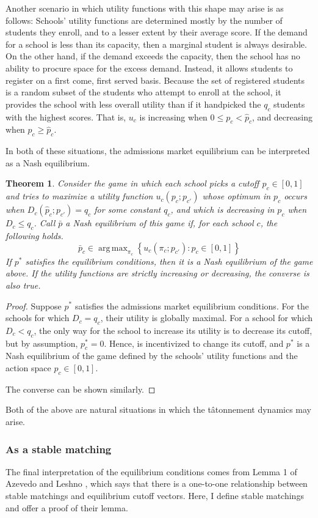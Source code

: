 \documentclass[12pt]{article}
\numberwithin{equation}{subsection}
\newtheorem{theorem}{Theorem}
\theoremstyle{definition}
\DeclareMathOperator*{\argmax}{arg\,max}
\begin{document}
Another scenario in which utility functions with this shape may arise is as follows: Schools' utility functions are determined mostly by the number of students they enroll, and to a lesser extent by their average score. If the demand for a school is less than its capacity, then a marginal student is always desirable. On the other hand, if the demand exceeds the capacity, then the school has no ability to procure space for the excess demand. Instead, it allows students to register on a first come, first served basis. Because the set of registered students is a random subset of the students who attempt to enroll at the school, it provides the school with less overall utility than if it handpicked the $q_c$ students with the highest scores. That is, $u_c$ is increasing when $0 \leq p_c < \hat p_c$, and decreasing when $p_c \geq \hat p_c$. 

In both of these situations, the admissions market equilibrium can be interpreted as a Nash equilibrium. 
\begin{theorem}
Consider the game in which each school picks a cutoff $p_c \in [0,1]$ and tries to maximize a utility function $u_c(p_c; p_{c'})$ whose optimum in $p_c$ occurs when $D_c(\hat p_c; p_{c'}) = q_c$ for some constant $q_c$, and which is decreasing in $p_c$ when $D_c \leq q_c$. Call $\bar p$ a Nash equilibrium of this game if, for each school $c$, the following holds.
\[\bar p_c \in \argmax_{\pi_c} \left\{ u_c(\pi_c; p_{c'}) : p_c \in [0,1] \right\}\]
If $p^*$ satisfies the equilibrium conditions, then it is a Nash equilibrium of the game above. If the utility functions are strictly increasing or decreasing, the converse is also true.
\end{theorem}
\begin{proof} Suppose $p^*$ satisfies the admissions market equilibrium conditions. For the schools for which $D_c = q_c$, their utility is globally maximal. For a school for which $D_c < q_c$, the only way for the school to increase its utility is to decrease its cutoff, but by assumption, $p_c^* = 0$. Hence, is incentivized to change its cutoff, and $p^*$ is a Nash equilibrium of the game defined by the schools' utility functions and the action space $p_c \in [0, 1]$.

The converse can be shown similarly.\end{proof}

Both of the above are natural situations in which the t\^{atonnement} dynamics may arise.

\subsubsection{As a stable matching}
The final interpretation of the equilibrium conditions comes from Lemma 1 of Azevedo and Leshno \parencite*{supplydemandfw}, which says that there is a one-to-one relationship between stable matchings and equilibrium cutoff vectors. Here, I define stable matchings and offer a proof of their lemma. 
\end{document}

